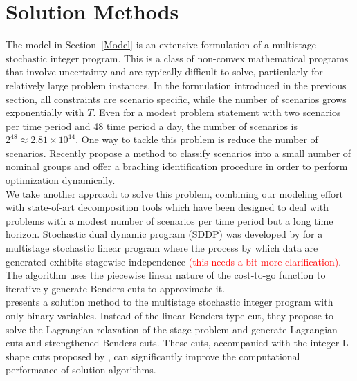 \documentclass[12pt]{article}
\begin{document}
\section{Solution Methods}
	The model in Section~\ref{Model} is an extensive formulation of a multistage stochastic integer program. This is a class of non-convex mathematical programs that involve uncertainty and are typically difficult to solve, particularly for relatively large problem instances. In the formulation introduced in the previous section, all constraints are scenario specific, while the number of scenarios grows exponentially with \(T\). Even for a modest problem statement with two scenarios per time period and 48 time period a day, the number of scenarios is \(2^{48} \approx 2.81\times 10^{14}\). One way to tackle this problem is reduce the number of scenarios. Recently \cite{liu2008scenario} propose a method to classify scenarios into a small number of nominal groups and offer a braching identification procedure in order to perform optimization dynamically.\\
	\newline
	We take another approach to solve this problem, combining our modeling effort with state-of-art decomposition tools which have been designed to deal with problems with a modest number of scenarios per time period but a long time horizon. Stochastic dual dynamic program (SDDP) was developed by \cite{pereira1991multi} for a multistage stochastic linear program where the process by which data are generated exhibits stagewise independence \textcolor{red}{(this needs a bit more clarification)}. The algorithm uses the piecewise linear nature of the cost-to-go function to iteratively generate Benders cuts to approximate it.\\
	\newline \cite{zou2016nested} presents a solution method to the multistage stochastic integer program with only binary variables. Instead of the linear Benders type cut, they propose to solve the Lagrangian relaxation of the stage problem and generate Lagrangian cuts and strengthened Benders cuts. These cuts, accompanied with the integer L-shape cuts proposed by \cite{laporte1993integer}, can significantly improve the computational performance of solution algorithms.\\
\end{document}

